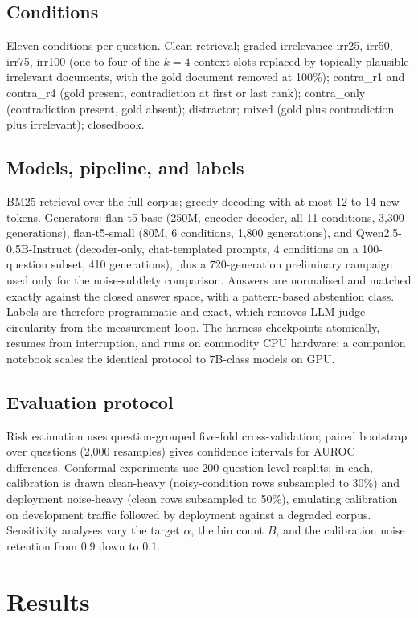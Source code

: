 \documentclass[sn-basic]{sn-jnl}
\theoremstyle{thmstyleone}
\theoremstyle{thmstyletwo}
\begin{document}
\subsection{Conditions}
Eleven conditions per question. Clean retrieval; graded irrelevance
irr25, irr50, irr75, irr100 (one to four of the $k = 4$ context slots
replaced by topically plausible irrelevant documents, with the gold
document removed at 100\%); contra\_r1 and contra\_r4 (gold present,
contradiction at first or last rank); contra\_only (contradiction
present, gold absent); distractor; mixed (gold plus contradiction plus
irrelevant); closedbook.

\subsection{Models, pipeline, and labels}
BM25 retrieval over the full corpus; greedy decoding with at most 12 to
14 new tokens. Generators: flan-t5-base (250M, encoder-decoder, all 11
conditions, 3{,}300 generations), flan-t5-small (80M, 6 conditions,
1{,}800 generations), and Qwen2.5-0.5B-Instruct (decoder-only,
chat-templated prompts, 4 conditions on a 100-question subset, 410
generations), plus a 720-generation preliminary campaign used only for
the noise-subtlety comparison. Answers are normalised and matched
exactly against the closed answer space, with a pattern-based
abstention class. Labels are therefore programmatic and exact, which
removes LLM-judge circularity from the measurement loop. The harness
checkpoints atomically, resumes from interruption, and runs on
commodity CPU hardware; a companion notebook scales the identical
protocol to 7B-class models on GPU.

\subsection{Evaluation protocol}
Risk estimation uses question-grouped five-fold cross-validation;
paired bootstrap over questions (2{,}000 resamples) gives confidence
intervals for AUROC differences. Conformal experiments use 200
question-level resplits; in each, calibration is drawn clean-heavy
(noisy-condition rows subsampled to 30\%) and deployment noise-heavy
(clean rows subsampled to 50\%), emulating calibration on development
traffic followed by deployment against a degraded corpus. Sensitivity
analyses vary the target $\alpha$, the bin count $B$, and the
calibration noise retention from 0.9 down to 0.1.

\section{Results}\label{sec:results}
\end{document}
